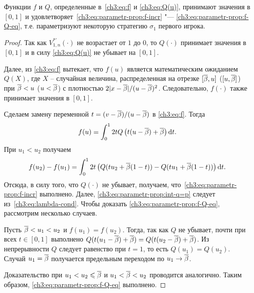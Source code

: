 {\begin{lemma}
  \label{ch3:lem:f-Q-is-strategy}
  Функции $f$ и $Q$\textnormal{,} определенные в~\eqref{ch3:eq:f} и \eqref{ch3:eq:Q(u)}\textnormal{,} принимают значения в $[0, 1]$ и удовлетворяет~\eqref{ch3:eq:parametr-prop:f-incr} "--- \eqref{ch3:eq:parametr-prop:f-Q-eq}\textnormal{,} т.е. параметризуют некоторую стратегию $\sigma_1$ первого игрока.
\end{lemma}
\begin{proof}
  Так как $V^{*\prime}_{1,n}(\cdot)$ не возрастает от $1$ до $0$, то $Q(\cdot)$ принимает значения в $[0, 1]$ и в силу \eqref{ch3:eq:Q(u)} не убывает на $[0, 1]$.

  Далее, из \eqref{ch3:eq:f} вытекает, что $f(u)$ является математическим ожиданием $Q(X)$, где $X$ -- случайная величина, распределенная на отрезке $[{{\overline{\beta}}}, u]$ ($[u, {{\overline{\beta}}}]$) при ${{\overline{\beta}}} < u$ ($u < {{\overline{\beta}}}$) с плотностью $2|x-{{\overline{\beta}}}|/(u-{{\overline{\beta}}})^2$.
  Следовательно, $f(\cdot)$ также принимает значения в $[0, 1]$.

  Сделаем замену переменной $t = (v - {{\overline{\beta}}})/(u - {{\overline{\beta}}})$ в \eqref{ch3:eq:f}. Тогда
  \begin{equation*}
    f(u) = \int_0^1 2 t Q \left( t(u - {{\overline{\beta}}}) + {{\overline{\beta}}} \right) \mathop{}\!\mathrm{d} t.
  \end{equation*}
  При $u_1 < u_2$ получаем
  \begin{equation*}
    f(u_2) - f(u_1) =
    \int_0^1 2t \left( 
      Q(t u_2 + {{\overline{\beta}}}(1-t)) - Q(t u_1 + {{\overline{\beta}}} (1-t))
    \right) \mathop{}\!\mathrm{d} t.
  \end{equation*}
  Отсюда, в силу того, что $Q(\cdot)$ не убывает, получаем, что~\eqref{ch3:eq:parametr-prop:f-incr} выполнено.
  Далее, \eqref{ch3:eq:parametr-prop:int-q=p} следует из~\ref{ch3:eq:lambda-cond}.
  Чтобы доказать \eqref{ch3:eq:parametr-prop:f-Q-eq}, рассмотрим несколько случаев.

  Пусть ${{\overline{\beta}}} < u_1 < u_2$ и $f(u_1) = f(u_2)$.
  Тогда, так как $Q$ не убывает, почти при всех $t \in [0, 1]$ выполнено $ Q(t(u_1 - {{\overline{\beta}}}) + {{\overline{\beta}}}) = Q(t(u_2 - {{\overline{\beta}}}) + {{\overline{\beta}}})$.
  Из непрерывности $Q$ следует равенство при $t = 1$, то есть $Q(u_1) = Q(u_2)$.
  Случай $u_1 = {{\overline{\beta}}}$ получается предельным переходом по $u_1 \rightarrow {{\overline{\beta}}}$.

  Доказательство при $u_1 < u_2 \leqslant {{\overline{\beta}}}$ и $u_1 < {{\overline{\beta}}} < u_2$ проводится аналогично.
  Таким образом, \eqref{ch3:eq:parametr-prop:f-Q-eq} выполнено.
\end{proof}

}
